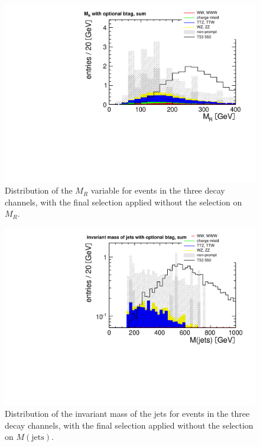 \begin{figure}[htb]
    \centering
    \includegraphics[width=.7\textwidth]{images/pdf/4jets_AND_r02_AND_had_mass350/mr_optional_btag_sum_0}
    \caption{Distribution of the $M_R$ variable for events in the three decay
        channels, with the final
    selection applied without the selection on $M_R$.}
    \label{fig:nomr}
\end{figure}

\begin{figure}[htb]
    \centering
    \includegraphics[width=.7\textwidth]{images/pdf/4jets_AND_mr200_AND_r02/had_mass_optional_btag_sum_0}
    \caption{Distribution of the invariant mass of the jets for events in the three decay
        channels, with the final
        selection applied without the selection on $M(\text{jets})$.}
    \label{fig:nohadmass}
\end{figure}
